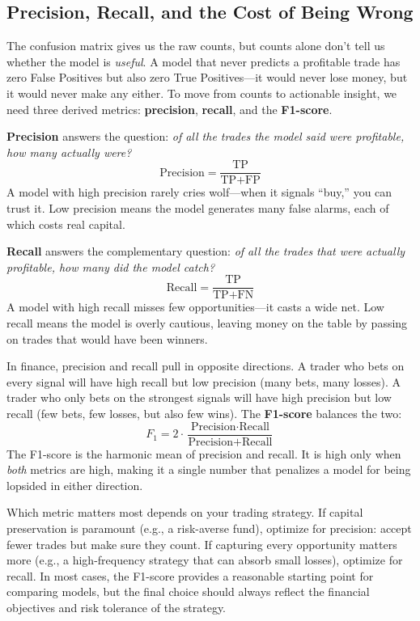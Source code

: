 \subsection{Precision, Recall, and the Cost of Being Wrong}

The confusion matrix gives us the raw counts, but counts alone don't tell us whether the model is
\textit{useful}. A model that never predicts a profitable trade has zero False Positives but also zero
True Positives---it would never lose money, but it would never make any either. To move from counts to
actionable insight, we need three derived metrics: \textbf{precision}, \textbf{recall}, and the
\textbf{F1-score}.

\textbf{Precision} answers the question: \textit{of all the trades the model said were profitable, how
many actually were?}
\[
\text{Precision} = \frac{\text{TP}}{\text{TP} + \text{FP}}
\]
A model with high precision rarely cries wolf---when it signals ``buy,'' you can trust it. Low
precision means the model generates many false alarms, each of which costs real capital.

\textbf{Recall} answers the complementary question: \textit{of all the trades that were actually
profitable, how many did the model catch?}
\[
\text{Recall} = \frac{\text{TP}}{\text{TP} + \text{FN}}
\]
A model with high recall misses few opportunities---it casts a wide net. Low recall means the model is
overly cautious, leaving money on the table by passing on trades that would have been winners.

In finance, precision and recall pull in opposite directions. A trader who bets on every signal will
have high recall but low precision (many bets, many losses). A trader who only bets on the strongest
signals will have high precision but low recall (few bets, few losses, but also few wins). The
\textbf{F1-score} balances the two:
\[
F_1 = 2 \cdot \frac{\text{Precision} \cdot \text{Recall}}{\text{Precision} + \text{Recall}}
\]
The F1-score is the harmonic mean of precision and recall. It is high only when \textit{both} metrics
are high, making it a single number that penalizes a model for being lopsided in either direction.

Which metric matters most depends on your trading strategy. If capital preservation is paramount (e.g.,
a risk-averse fund), optimize for precision: accept fewer trades but make sure they count. If capturing
every opportunity matters more (e.g., a high-frequency strategy that can absorb small losses), optimize
for recall. In most cases, the F1-score provides a reasonable starting point for comparing models, but
the final choice should always reflect the financial objectives and risk tolerance of the strategy.

